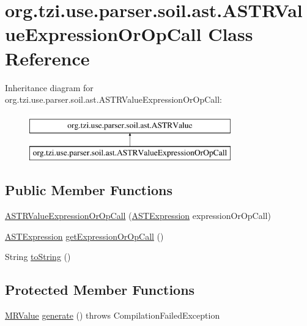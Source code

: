 \hypertarget{classorg_1_1tzi_1_1use_1_1parser_1_1soil_1_1ast_1_1_a_s_t_r_value_expression_or_op_call}{\section{org.\-tzi.\-use.\-parser.\-soil.\-ast.\-A\-S\-T\-R\-Value\-Expression\-Or\-Op\-Call Class Reference}
\label{classorg_1_1tzi_1_1use_1_1parser_1_1soil_1_1ast_1_1_a_s_t_r_value_expression_or_op_call}
}
Inheritance diagram for org.\-tzi.\-use.\-parser.\-soil.\-ast.\-A\-S\-T\-R\-Value\-Expression\-Or\-Op\-Call\-:\begin{figure}[H]
\begin{center}
\leavevmode
\includegraphics[height=2.000000cm]{classorg_1_1tzi_1_1use_1_1parser_1_1soil_1_1ast_1_1_a_s_t_r_value_expression_or_op_call}
\end{center}
\end{figure}
\subsection*{Public Member Functions}
\begin{DoxyCompactItemize}
\item 
\hyperlink{classorg_1_1tzi_1_1use_1_1parser_1_1soil_1_1ast_1_1_a_s_t_r_value_expression_or_op_call_acc1b36ba56b2a9632c94efbe60866914}{A\-S\-T\-R\-Value\-Expression\-Or\-Op\-Call} (\hyperlink{classorg_1_1tzi_1_1use_1_1parser_1_1ocl_1_1_a_s_t_expression}{A\-S\-T\-Expression} expression\-Or\-Op\-Call)
\item 
\hyperlink{classorg_1_1tzi_1_1use_1_1parser_1_1ocl_1_1_a_s_t_expression}{A\-S\-T\-Expression} \hyperlink{classorg_1_1tzi_1_1use_1_1parser_1_1soil_1_1ast_1_1_a_s_t_r_value_expression_or_op_call_a1becc10ee0405bba6bce269c3b1405f8}{get\-Expression\-Or\-Op\-Call} ()
\item 
String \hyperlink{classorg_1_1tzi_1_1use_1_1parser_1_1soil_1_1ast_1_1_a_s_t_r_value_expression_or_op_call_a21259fa7a2b60ff21a674ad2f5f496c5}{to\-String} ()
\end{DoxyCompactItemize}
\subsection*{Protected Member Functions}
\begin{DoxyCompactItemize}
\item 
\hyperlink{classorg_1_1tzi_1_1use_1_1uml_1_1sys_1_1soil_1_1_m_r_value}{M\-R\-Value} \hyperlink{classorg_1_1tzi_1_1use_1_1parser_1_1soil_1_1ast_1_1_a_s_t_r_value_expression_or_op_call_a96614070af08cbd22543fb9a5ceb3e5d}{generate} ()  throws Compilation\-Failed\-Exception 
\end{DoxyCompactItemize}
